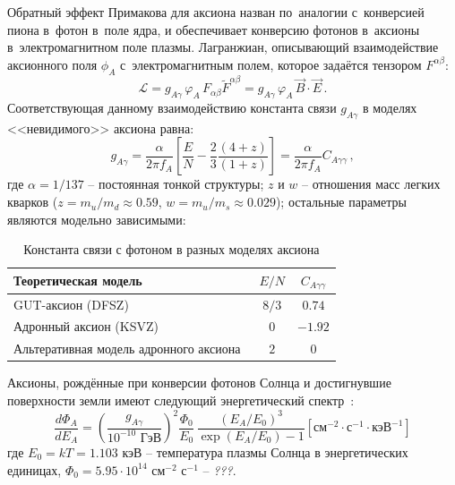 \documentclass[a4paper,article,14pt]{extarticle}
\begin{document}
Обратный эффект Примакова для аксиона назван по~аналогии с~конверсией пиона в~фотон в~поле ядра, и обеспечивает конверсию фотонов в~аксионы в~электромагнитном поле плазмы.
Лагранжиан, описывающий взаимодействие аксионного поля $\phi_A$ с~электромагнитным полем, которое задаётся тензором $F^{\alpha \beta}$:
\begin{equation}
    \mathcal{L} =
        g_{A\gamma}\, \varphi_A\, F_{\alpha\beta} \tilde{F}^{\alpha\beta} =
        g_{A\gamma}\, \varphi_A\,\vec{B} \cdot \vec{E}\, .
\end{equation}
Соответствующая данному взаимодействию константа связи $g_{A\gamma}$ в моделях <<невидимого>> аксиона равна:
\begin{equation}\label{gAy}
   g_{A\gamma} =
        \frac{\alpha}{2 \pi {f_A}}
        \left[
            \frac{E}{N} - \frac{2}{3} \frac{(4 + z)}{(1 + z)}
        \right] =
        \frac{\alpha}{2 \pi {f_A}} C_{A\gamma\gamma}\, ,
\end{equation}
где $\alpha = 1/137 $ -- постоянная тонкой структуры; $z$ и $w$ -- отношения масс легких кварков ($z = m_u/m_d \approx 0.59$, $w = m_u/m_s \approx 0.029$); остальные параметры являются модельно зависимыми:
\begin{table}[h!]
    \centering
    \begin{tabular}{|l|c|c|}
    \hline
    Теоретическая модель & $E/N$ & $C_{A\gamma\gamma}$ \\
    \hline
    \hline
    GUT-аксион (DFSZ) & $8/3$ & $0.74$ \\
    \hline
    Адронный аксион (KSVZ) & $0$ & $-1.92$ \\
    \hline
    Альтеративная модель адронного аксиона~\cite{hadronic2} & $2$ & $0$ \\
    \hline
\end{tabular}
\caption{Константа связи с фотоном в разных моделях аксиона}\label{tab:gay}
\end{table}\newline
Аксионы, рождённые при конверсии фотонов Солнца и достигнувшие поверхности земли имеют следующий энергетический спектр~\cite{solarflux1,solarflux2,solarflux3}:
\begin{equation}
    \frac{d \Phi_A}{d E_A} =
        \left(
            \frac{g_{A\gamma}}{10^{-10} \text{\ ГэВ}}
        \right)^2
        \frac{\Phi_0}{E_0}\,
        \frac{(E_A / E_0)^3}{\exp(E_A / E_0) - 1}
        \left[
            \text{см}^{-2} \cdot \text{с}^{-1} \cdot \text{кэВ}^{-1}
        \right]
\end{equation}
где ${E_0} = kT = 1.103 \text{\ кэВ}$ -- температура плазмы Солнца в энергетических единицах, ${{\Phi _0}} = 5.95 \cdot 10^{14} \text{ см} ^{-2} \text{ с} ^{-1}$ -- \emph{???}.
\end{document}
